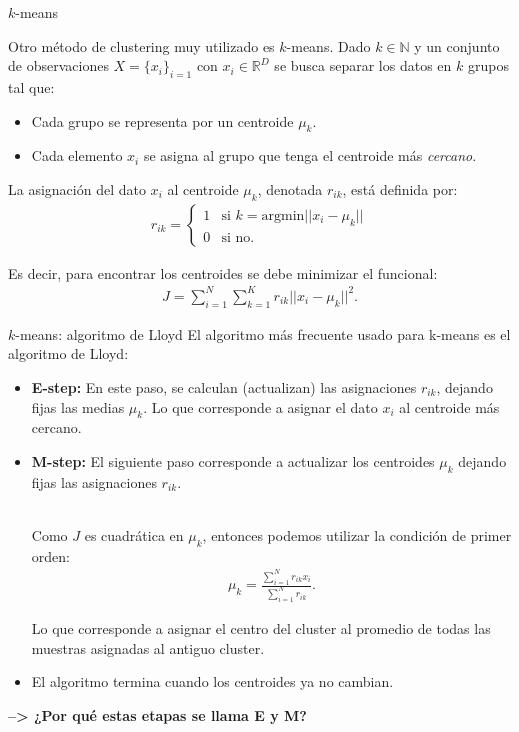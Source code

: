 \documentclass[handout, 9pt]{beamer}
\begin{document}
\begin{frame}{$k$-means}

Otro método de clustering muy utilizado es $k$-means. Dado $k \in \mathbb{N}$ y un conjunto de observaciones $X = \{x_i\}_{i=1}$ con $x_i\in \mathbb{R}^D$ se busca separar los datos en $k$ grupos tal que:

\begin{itemize}
	\item Cada grupo se representa por un centroide $\mu_k$.\pause
	\item Cada elemento $x_i$ se asigna al grupo que tenga el centroide más \emph{cercano}.\pause
\end{itemize}

La asignación del dato $x_i$ al centroide $\mu_k$, denotada $r_{ik}$, está definida por:
\begin{align*}
r_{ik} = \begin{cases}
1 & \text{si } k = \text{argmin}||x_i-\mu_k||\\
0 & \text{si no.}
\end{cases}
\end{align*}

\pause
Es decir, para encontrar los centroides se debe minimizar el funcional:
\begin{align*}
J = \sum_{i=1}^N \sum_{k=1}^K r_{ik} ||x_i-\mu_k||^2.
\end{align*}
	
\end{frame}

\begin{frame}{$k$-means: algoritmo de Lloyd}
	El algoritmo más frecuente usado para k-means es el algoritmo de Lloyd:\pause

\begin{itemize}
    \item \textbf{E-step:} En este paso, se calculan (actualizan) las asignaciones $r_{ik}$, dejando fijas las medias $\mu_k$. Lo que corresponde a asignar el dato $x_i$ al centroide más cercano.\pause
    \item \textbf{M-step:} El siguiente paso corresponde a actualizar los centroides $\mu_k$ dejando fijas las asignaciones $r_{ik}$.\\~\
    \pause
    
    Como $J$ es cuadrática en $\mu_k$, entonces podemos utilizar la condición de primer orden:
    \begin{align*}
        \mu_k = \frac{\sum_{i=1}^N r_{ik}x_i}{\sum_{i=1}^N r_{ik}}.
    \end{align*}
    
    Lo que corresponde a asignar el centro del cluster al promedio de todas las muestras asignadas al antiguo cluster.
    \pause
    \item El algoritmo termina cuando los centroides ya no cambian.
\end{itemize}
\vspace{1em}
\textbf{--> ¿Por qué estas etapas se llama E y M?}

\end{frame}
\end{document}
